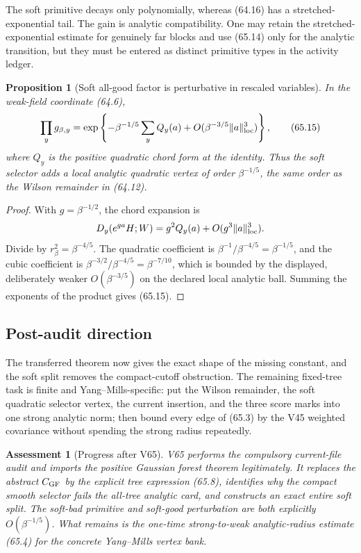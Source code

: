 \documentclass[11pt,oneside]{book}
\newtheorem{proposition}[theorem]{Proposition}
\newtheorem{assessment}[theorem]{Assessment}
\theoremstyle{definition}
\theoremstyle{remark}
\begin{document}
The soft primitive decays only polynomially, whereas (64.16) has a
stretched-exponential tail.  The gain is analytic compatibility.
One may retain the stretched-exponential estimate for genuinely far
blocks and use (65.14) only for the analytic transition, but they
must be entered as distinct primitive types in the activity ledger.

\begin{proposition}[Soft all-good factor is perturbative in rescaled
variables]
\label{prop:e8v65-soft-good}
In the weak-field coordinate (64.6),
\[
 \prod_y g_{\beta,y}
 =\exp\left\{-\beta^{-1/5}
 \sum_y Q_y(a)+O(\beta^{-3/5}\|a\|_{\rm loc}^3)\right\},     \tag{65.15}
\]
where \(Q_y\) is the positive quadratic chord form at the identity.
Thus the soft selector adds a local analytic quadratic vertex of
order \(\beta^{-1/5}\), the same order as the Wilson remainder in
(64.12).
\end{proposition}

\begin{proof}
With \(g=\beta^{-1/2}\), the chord expansion is
\[
 D_y(e^{ga}H;W)=g^2Q_y(a)+O(g^3\|a\|_{\rm loc}^3).
\]
Divide by \(r_\beta^2=\beta^{-4/5}\).  The quadratic coefficient is
\(\beta^{-1}/\beta^{-4/5}=\beta^{-1/5}\), and the cubic coefficient
is \(\beta^{-3/2}/\beta^{-4/5}=\beta^{-7/10}\), which is bounded by
the displayed, deliberately weaker \(O(\beta^{-3/5})\) on the
declared local analytic ball.  Summing the exponents of the product
gives (65.15).
\end{proof}

\subsection{Post-audit direction}

The transferred theorem now gives the exact shape of the missing
constant, and the soft split removes the compact-cutoff obstruction.
The remaining fixed-tree task is finite and Yang--Mills-specific:
put the Wilson remainder, the soft quadratic selector vertex, the
current insertion, and the three score marks into one strong
analytic norm; then bound every edge of (65.3) by the V45 weighted
covariance without spending the strong radius repeatedly.

\begin{assessment}[Progress after V65]
\label{ass:e8v65-status}
V65 performs the compulsory current-file audit and imports the
positive Gaussian forest theorem legitimately.  It replaces the
abstract \(C_{\rm GF}\) by the explicit tree expression (65.8),
identifies why the compact smooth selector fails the all-tree
analytic card, and constructs an exact entire soft split.  The
soft-bad primitive and soft-good perturbation are both explicitly
\(O(\beta^{-1/5})\).  What remains is the one-time strong-to-weak
analytic-radius estimate (65.4) for the concrete Yang--Mills vertex
bank.
\end{assessment}
\end{document}

